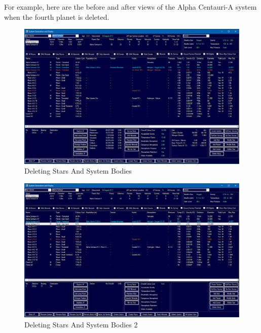 \documentclass[../../Aurora C# unofficial manual.tex]{subfiles}
\begin{document}
	For example, here are the before and after views of the Alpha Centauri-A system when the fourth planet is deleted.
	\begin{figure}[H]
		\centering
		\includegraphics[width=0.95\linewidth]{images/DeletingStarsAndBodies}
		\caption[Deleting Stars And System Bodies]{Deleting Stars And System Bodies}
		\label{fig:deletingstarsandbodies}
	\end{figure}
	\begin{figure}[H]
		\centering
		\includegraphics[width=0.95\linewidth]{images/DeletingStarsAndBodies2}
		\caption[Deleting Stars And System Bodies]{Deleting Stars And System Bodies 2}
		\label{fig:deletingstarsandbodies2}
	\end{figure}
\end{document}

